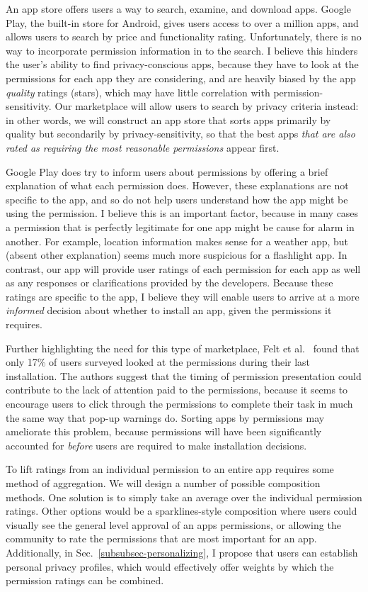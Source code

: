 \documentclass[11pt]{article}
\begin{document}
An app store offers users a way to search, examine, and download
apps.  Google Play, the built-in store for Android, gives
users access to over a million apps, and allows users to search by
price and functionality rating. Unfortunately, there is no way to incorporate
permission information in to the search. I believe this hinders the
user's ability to find privacy-conscious apps, because they have to
look at the permissions for each app they are considering, and are
heavily biased by the app \emph{quality} ratings (stars), which may
have little correlation with permission-sensitivity. Our marketplace
will allow users to search by privacy criteria instead: in other
words, we will construct an app store that sorts apps primarily by
quality but secondarily by privacy-sensitivity, so that the best apps
\emph{that are also rated as requiring the most reasonable
  permissions} appear first.

Google Play does try to inform users about permissions by offering a
brief explanation of what each permission does. However, these
explanations are not specific to the app, and so do not help
users understand how the app might be using the permission. I 
believe this is an important factor, because in many cases a
permission that is perfectly legitimate for one app might be cause for
alarm in another. For example, location information makes 
sense for a weather app, but (absent other explanation) seems much
more suspicious for a flashlight app. In contrast, our app will
provide user ratings of each permission for each app 
as well as any responses or clarifications provided by the
developers. Because these ratings are specific to the app, I believe
they will enable users to arrive at a more \emph{informed} decision about
whether to install an app, given the permissions it requires.

Further highlighting the need for this type of marketplace, 
Felt et al.\ \cite{android-attention-SOUPS12} 
found that only 17\% of users surveyed looked at the permissions during
their last installation. The authors suggest that the timing of
permission presentation could contribute to the lack of attention paid
to the permissions, because it seems to encourage users to click
through the permissions to complete their task in much the same way
that pop-up warnings do. Sorting apps by permissions
may ameliorate this problem, because 
permissions will have been significantly accounted for \emph{before}
users are required to make installation decisions.

To lift ratings from an individual permission to an entire app
requires some method of aggregation. We will design a
number of possible composition methods. One solution is to simply take
an average over the individual permission ratings. Other options would
be a sparklines-style composition where users could visually see the
general level approval of an apps permissions, or allowing the
community to rate the permissions that are most important for an app. 
Additionally, in 
Sec.~\ref{subsubsec-personalizing}, I propose that users
can establish personal privacy profiles, which would effectively offer
weights by which the permission ratings can be combined.
\end{document}
